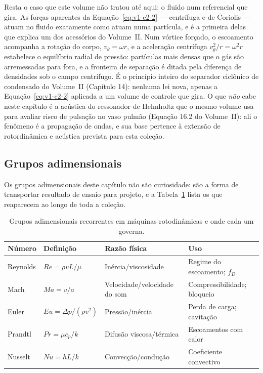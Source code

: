 \documentclass[12pt,a4paper]{article}
\numberwithin{equation}{section}
\numberwithin{table}{section}
\numberwithin{figure}{section}
\begin{document}
Resta o caso que este volume não tratou até aqui: o fluido num referencial
que gira. As forças aparentes da Equação~\eqref{eq:v1-c2-2} --- centrífuga e
de Coriolis --- atuam no fluido exatamente como atuam numa partícula, e é a
primeira delas que explica um dos acessórios do Volume~II. Num vórtice
forçado, o escoamento acompanha a rotação do corpo, $v_\theta = \omega r$, e
a aceleração centrífuga $v_\theta^2/r = \omega^2 r$ estabelece o equilíbrio
radial de pressão: partículas mais densas que o gás são arremessadas para
fora, e a fronteira de separação é ditada pela diferença de densidades sob o
campo centrífugo. É o princípio inteiro do separador ciclônico de condensado
do Volume~II (Capítulo 14): nenhuma lei nova, apenas a
Equação~\eqref{eq:v1-c2-2} aplicada a um volume de controle que gira. O que
\emph{não} cabe neste capítulo é a acústica do ressonador de Helmholtz que o
mesmo volume usa para avaliar risco de pulsação no vaso pulmão (Equação 16.2
do Volume~II): ali o fenômeno é a propagação de ondas, e sua base pertence à
extensão de rotordinâmica e acústica prevista para esta coleção.

\subsection{Grupos adimensionais}\label{sub:v1-c4-adimensionais}

Os grupos adimensionais deste capítulo não são curiosidade: são a forma de
transportar resultado de ensaio para projeto, e a Tabela~\ref{tab:v1-c4-1}
lista os que reaparecem ao longo de toda a coleção.

\begin{table}[H]
\centering
\small
\caption[Grupos adimensionais de escoamento]{Grupos adimensionais
recorrentes em máquinas rotodinâmicas e onde cada um governa.}
\label{tab:v1-c4-1}
\begin{tabular}{@{}llll@{}}
\toprule
\textbf{Número} & \textbf{Definição} & \textbf{Razão física} & \textbf{Uso} \\
\midrule
Reynolds & $Re = \rho v L / \mu$ & Inércia/viscosidade & Regime do escoamento; $f_D$ \\
Mach & $Ma = v/a$ & Velocidade/velocidade do som & Compressibilidade; bloqueio \\
Euler & $Eu = \Delta p / (\rho v^2)$ & Pressão/inércia & Perda de carga; cavitação \\
Prandtl & $Pr = \mu c_p / k$ & Difusão viscosa/térmica & Escoamentos com calor \\
Nusselt & $Nu = hL/k$ & Convecção/condução & Coeficiente convectivo \\
\bottomrule
\end{tabular}
\end{table}
\end{document}
